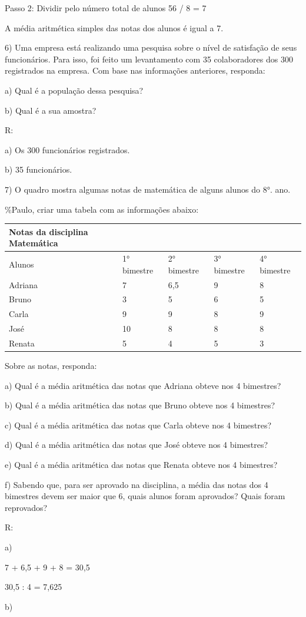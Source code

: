 Passo 2: Dividir pelo número total de alunos 56 / 8 = 7

A média aritmética simples das notas dos alunos é igual a 7.

6) Uma empresa está realizando uma pesquisa sobre o nível de satisfação
de seus funcionários. Para isso, foi feito um levantamento com 35
colaboradores dos 300 registrados na empresa. Com base nas informações
anteriores, responda:

a) Qual é a população dessa pesquisa?

b) Qual é a sua amostra?

R:

a) Os 300 funcionários registrados.

b) 35 funcionários.

7) O quadro mostra algumas notas de matemática de alguns alunos do 8°.
ano.

\%Paulo, criar uma tabela com as informações abaixo:

\begin{longtable}[]{@{}lllll@{}}
\toprule
Notas da disciplina Matemática & & & &\tabularnewline
\midrule
\endhead
Alunos & 1° bimestre & 2° bimestre & 3° bimestre & 4°
bimestre\tabularnewline
Adriana & 7 & 6,5 & 9 & 8\tabularnewline
Bruno & 3 & 5 & 6 & 5\tabularnewline
Carla & 9 & 9 & 8 & 9\tabularnewline
José & 10 & 8 & 8 & 8\tabularnewline
Renata & 5 & 4 & 5 & 3\tabularnewline
\bottomrule
\end{longtable}

Sobre as notas, responda:

a) Qual é a média aritmética das notas que Adriana obteve nos 4
bimestres?

b) Qual é a média aritmética das notas que Bruno obteve nos 4 bimestres?

c) Qual é a média aritmética das notas que Carla obteve nos 4 bimestres?

d) Qual é a média aritmética das notas que José obteve nos 4 bimestres?

e) Qual é a média aritmética das notas que Renata obteve nos 4
bimestres?

f) Sabendo que, para ser aprovado na disciplina, a média das notas dos 4
bimestres devem ser maior que 6, quais alunos foram aprovados? Quais
foram reprovados?

R:

a)

7 + 6,5 + 9 + 8 = 30,5

30,5 : 4 = 7,625

b)

